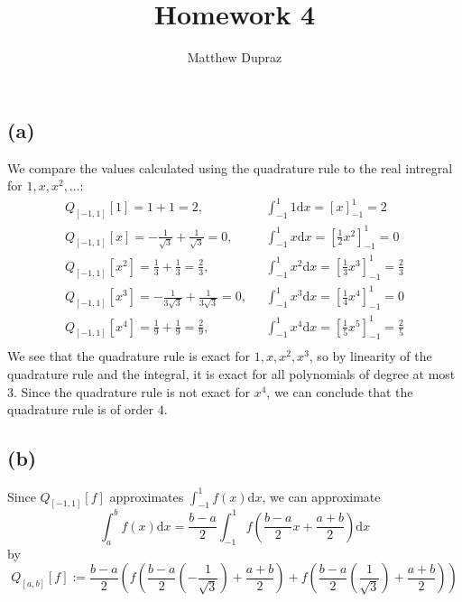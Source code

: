 \documentclass{article}
\title{Homework 4}
\author{Matthew Dupraz}
\begin{document}
\newcommand{\Q}[3]{Q_{[#1, #2]}[#3]}
\newcommand{\dx}{\mathrm{d}x}

\maketitle

\subsection*{(a)}

We compare the values calculated using the quadrature rule to the
real intregral for $1, x, x^2, \dots$:
\begin{align*}
   \Q{-1}{1}{1} = 1 + 1 = 2,& ~~~ \int_{-1}^1 1\dx = 
   \left[x\right]_{-1}^1 = 2\\
   \Q{-1}{1}{x} = -\frac{1}{\sqrt{3}} + \frac{1}{\sqrt{3}} = 0,
   & ~~~ \int_{-1}^1 x\dx =
   \left[\frac{1}{2}x^2\right]_{-1}^1 = 0\\
   \Q{-1}{1}{x^2} = \frac{1}{3} + \frac{1}{3} = \frac{2}{3},
   & ~~~ \int_{-1}^1 x^2\dx = 
   \left[\frac{1}{3}x^3\right]_{-1}^1 = \frac{2}{3}\\
   \Q{-1}{1}{x^3} = -\frac{1}{3\sqrt{3}} + \frac{1}{3\sqrt{3}} = 0,
   & ~~~ \int_{-1}^1 x^3\dx = 
   \left[\frac{1}{4}x^4\right]_{-1}^1 = 0\\
   \Q{-1}{1}{x^4} = \frac{1}{9} + \frac{1}{9} = \frac{2}{9},
   & ~~~ \int_{-1}^1 x^4\dx = 
   \left[\frac{1}{5}x^5\right]_{-1}^1 = \frac{2}{5}\\
\end{align*}
We see that the quadrature rule is exact for $1, x, x^2, x^3$, so
by linearity of the quadrature rule and the integral,
it is exact for all polynomials of degree at most $3$.
Since the quadrature rule is not exact for $x^4$, we can conclude
that the quadrature rule is of order $4$.

\subsection*{(b)}
Since $\Q{-1}{1}{f}$ approximates $\int_{-1}^{1}f(x)\dx$,
we can approximate
\[\int_a^b f(x)\dx
= \frac{b - a}{2}\int_{-1}^1
f\left(\frac{b-a}{2}x + \frac{a+b}{2}\right)\dx\]
by
\[
   \Q{a}{b}{f} :=
   \frac{b-a}{2}\left(
      f\left(\frac{b-a}{2}\left(-\frac{1}{\sqrt{3}}\right)
      + \frac{a+b}{2}\right) + 
      f\left(\frac{b-a}{2}\left(\frac{1}{\sqrt{3}}\right)
      + \frac{a+b}{2}\right)
   \right)
\]
\end{document}
